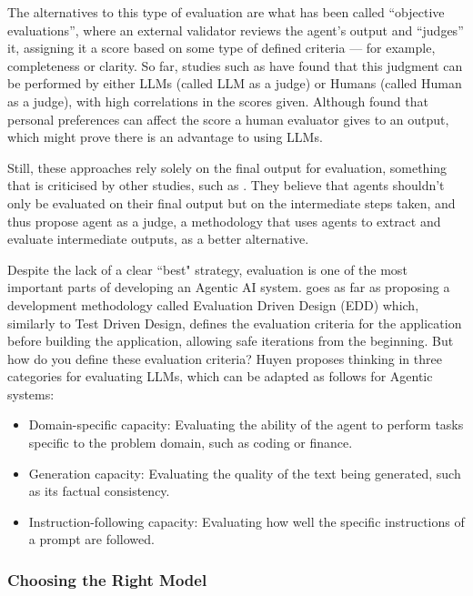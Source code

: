 \documentclass[a4paper]{report}
\begin{document}
The alternatives to this type of evaluation are what has been called ``objective evaluations'', where an external validator reviews the agent's output and ``judges'' it, assigning it a score based on some type of defined criteria --- for example, completeness or clarity. So far, studies such as \cite{wang2025replacehumanevaluators} have found that this judgment can be performed by either LLMs (called LLM as a judge) or Humans (called Human as a judge), with high correlations in the scores given. Although \cite{hu2023decipher} found that personal preferences can affect the score a human evaluator gives to an output, which might prove there is an advantage to using LLMs.

Still, these approaches rely solely on the final output for evaluation, something that is criticised by other studies, such as \cite{zhuge2024agentasajudgeevaluateagentsagents}. They believe that agents shouldn't only be evaluated on their final output but on the intermediate steps taken, and thus propose agent as a judge, a methodology that uses agents to extract and evaluate intermediate outputs, as a better alternative.

Despite the lack of a clear ``best" strategy, evaluation is one of the most important parts of developing an Agentic AI system. \cite{aiebook2025} goes as far as proposing a development methodology called Evaluation Driven Design (EDD) which, similarly to Test Driven Design, defines the evaluation criteria for the application before building the application, allowing safe iterations from the beginning. But how do you define these evaluation criteria? Huyen proposes thinking in three categories for evaluating LLMs, which can be adapted as follows for Agentic systems:

\begin{itemize}
    \item Domain-specific capacity: Evaluating the ability of the agent to perform tasks specific to the problem domain, such as coding or finance.
    \item Generation capacity: Evaluating the quality of the text being generated, such as its factual consistency.
    \item Instruction-following capacity: Evaluating how well the specific instructions of a prompt are followed.
\end{itemize}

\subsubsection{Choosing the Right Model}
\end{document}

